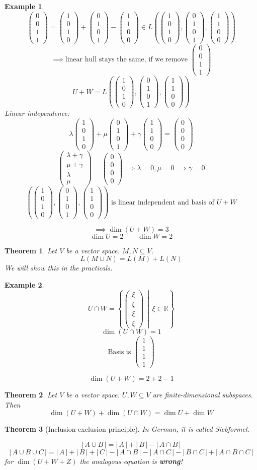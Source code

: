 \documentclass[a4paper,landscape,twocolumn]{article}
\newcommand\setdef[2]{\left\{#1\,\middle|\,#2\right\}}
\newcommand\card[1]{\left|\,#1\,\right|}
\newcommand\vecfour[4]{\begin{pmatrix} #1 \\ #2 \\ #3 \\ #4 \end{pmatrix}}
\newtheorem{theorem}{Theorem}[section]
\newtheorem{ex}{Example}[section]
\begin{document}
\begin{ex}
  \[ \vecfour 0011 = \vecfour 1010 + \vecfour 0101 - \vecfour 1100 \in L\left(\vecfour 1010, \vecfour 0101, \vecfour 1100\right) \]
  \[ \implies \text{linear hull stays the same, if we remove } \vecfour 0011 \]
  \[ U+W = L\left(\vecfour 1010, \vecfour 0101, \vecfour 1100\right) \]
  Linear independence:
  \[ \lambda \vecfour 1010 + \mu \vecfour 0101 + \gamma \vecfour 1100 = \vecfour 0000 \]
  \[ \vecfour{\lambda+\gamma}{\mu+\gamma}{\lambda}{\mu} = \vecfour 0000 \implies \lambda = 0, \mu = 0 \implies \gamma = 0 \]
  \[ \left(\vecfour 1010, \vecfour 0101, \vecfour 1100\right) \text{ is linear independent and basis of } U + W \]

  \[ \implies \dim(U + W) = 3 \]
  \[ \dim{U} = 2 \qquad \dim{W} = 2 \]
\end{ex}

\begin{theorem}
  \label{lemma-4-4}
  Let $V$ be a vector space. $M, N \subseteq V$.
  \[ L(M \cup N) = L(M) + L(N) \]
  We will show this in the practicals.
\end{theorem}

\begin{ex}
  \[ U \cap W = \setdef{\vecfour{\xi}{\xi}{\xi}{\xi}}{\xi \in \mathbb R} \]
  \[ \dim(U \cap W) = 1 \]
  \[ \text{Basis is } \vecfour 1111 \]

  \[ \dim(U+W) = 2 + 2 - 1 \]
\end{ex}

\begin{theorem}
  Let $V$ be a vector space. $U, W \subseteq V$ are finite-dimensional subspaces.
  Then
  \[ \dim(U + W) + \dim(U \cap W) = \dim U + \dim W \]
\end{theorem}

\begin{theorem}[Inclusion-exclusion principle]
  \label{inclusion-exclusion}
  In German, it is called \foreignlanguage{ngerman}{Siebformel}.

  \[ \card{A \cup B} = \card{A} + \card{B} - \card{A \cap B} \]
  \[ \card{A \cup B \cup C} = \card{A} + \card{B} + \card{C} - \card{A \cap B} - \card{A \cap C} - \card{B \cap C} + \card{A \cap B \cap C} \]
  for $\dim(U + W + Z)$ the analogous equation is \textbf{wrong}!
\end{theorem}
\end{document}
